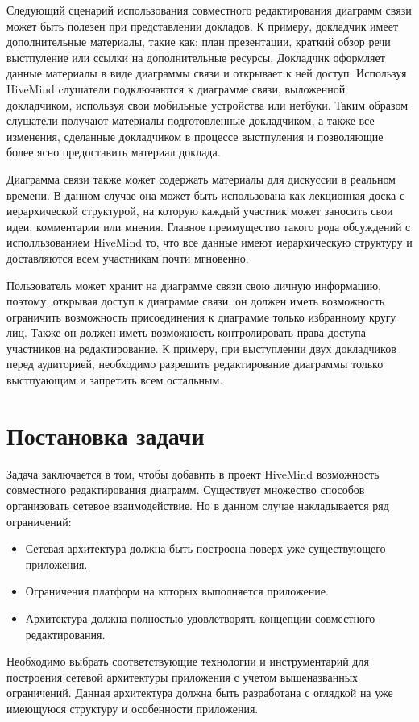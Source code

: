 Следующий сценарий использования совместного редактирования диаграмм связи может
быть полезен при представлении докладов. К примеру, докладчик имеет
дополнительные материалы, такие как: план презентации, краткий обзор речи
выстпуление или ссылки на дополнительные ресурсы. Докладчик оформляет данные
материалы в виде диаграммы связи и открывает к ней доступ. Используя HiveMind
cлушатели подключаются к диаграмме связи, выложенной докладчиком, используя свои
мобильные устройства или нетбуки. Таким образом слушатели получают материалы
подготовленные докладчиком, а также все изменения, сделанные докладчиком в
процессе выстпуления и позволяющие более ясно предоставить материал доклада.

Диаграмма связи также может содержать материалы для дискуссии в реальном
времени. В данном случае она может быть использована как лекционная доска с
иерархической структурой, на которую каждый участник может заносить свои идеи,
комментарии или мнения. Главное преимущество такого рода обсуждений с
исполльзованием HiveMind то, что все данные имеют иерархическую структуру и
доставляются всем участникам почти мгновенно.

Пользователь может хранит на диаграмме связи свою личную информацию, поэтому,
открывая доступ к диаграмме связи, он должен иметь возможность ограничить
возможность присоединения к диаграмме только избранному кругу лиц. Также он
должен иметь возможность контролировать права доступа участников на
редактирование. К примеру, при выступлении двух докладчиков перед аудиторией,
необходимо разрешить редактирование диаграммы только выстпуающим и
запретить всем остальным.


\section{Постановка задачи}
\label{sec:problem_statement}
Задача заключается в том, чтобы добавить в проект HiveMind возможность
совместного редактирования диаграмм. Существует множество способов организовать
сетевое взаимодействие. Но в данном случае накладывается ряд ограничений:

\begin{itemize}
\item Сетевая архитектура должна быть построена поверх уже существующего
приложения.
\item Ограничения платформ на которых выполняется приложение.
\item Архитектура должна полностью удовлетворять концепции совместного
редактирования.
\end{itemize}

Необходимо выбрать соответствующие технологии и инструментарий для построения
сетевой архитектуры приложения с учетом вышеназванных ограничений. Данная
архитектура должна быть разработана с оглядкой на уже имеющуюся структуру и
особенности приложения.
